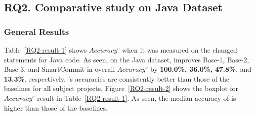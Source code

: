 \subsection{{\bf RQ2. Comparative study on Java Dataset}}






\subsubsection{General Results}

Table~\ref{RQ2-result-1} shows $Accuracy^{c}$ when it was measured on
the changed statements for Java code.  As seen, on the Java dataset,
{\tool} improves Base-1, Base-2, Base-3, and SmartCommit in overall
$Accuracy^c$ by {\bf 100.0\%, 36.0\%, 47.8\%}, and {\bf 13.3\%},
respectively. {\tool}'s accuracies are consistently better than those
of the baselines for all subject projects. Figure~\ref{RQ2-result-2}
shows the boxplot for $Accuracy^c$ result in
Table~\ref{RQ2-result-1}. As seen, the median accuracy of {\tool} is
higher than those of the baselines.



